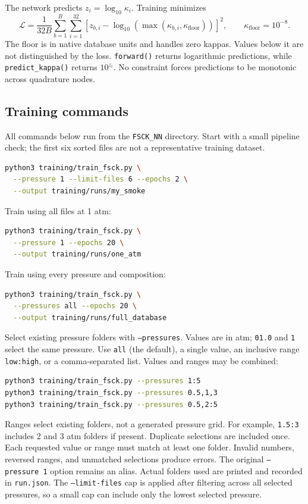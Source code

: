 \documentclass[11pt,letterpaper]{article}
\begin{document}
The network predicts $z_i=\log_{10}\kappa_i$. Training minimizes
\[
\mathcal{L}=\frac{1}{32B}\sum_{b=1}^{B}\sum_{i=1}^{32}
\left[z_{b,i}-\log_{10}\!\left(\max(\kappa_{b,i},\kappa_{\mathrm{floor}})\right)\right]^2,
\qquad \kappa_{\mathrm{floor}}=10^{-8}.
\]
The floor is in native database units and handles zero kappas. Values below it
are not distinguished by the loss. \texttt{forward()} returns logarithmic
predictions, while \texttt{predict\_kappa()} returns $10^{z_i}$. No constraint
forces predictions to be monotonic across quadrature nodes.

\subsection{Training commands}
All commands below run from the \texttt{FSCK\_NN} directory. Start with a small pipeline
check; the first six sorted files are not a representative training dataset.
\begin{lstlisting}[language=bash]
python3 training/train_fsck.py \
  --pressure 1 --limit-files 6 --epochs 2 \
  --output training/runs/my_smoke
\end{lstlisting}
Train using all files at 1 atm:
\begin{lstlisting}[language=bash]
python3 training/train_fsck.py \
  --pressure 1 --epochs 20 \
  --output training/runs/one_atm
\end{lstlisting}
Train using every pressure and composition:
\begin{lstlisting}[language=bash]
python3 training/train_fsck.py \
  --pressures all --epochs 20 \
  --output training/runs/full_database
\end{lstlisting}
Select existing pressure folders with \texttt{--pressures}. Values are in atm;
\texttt{01.0} and \texttt{1} select the same pressure. Use \texttt{all} (the
default), a single value, an inclusive range \texttt{low:high}, or a
comma-separated list. Values and ranges may be combined:
\begin{lstlisting}[language=bash]
python3 training/train_fsck.py --pressures 1:5
python3 training/train_fsck.py --pressures 0.5,1,3
python3 training/train_fsck.py --pressures 0.5,2:5
\end{lstlisting}
Ranges select existing folders, not a generated pressure grid. For example,
\texttt{1.5:3} includes 2 and 3 atm folders if present. Duplicate selections
are included once. Each requested value or range must match at least one
folder. Invalid numbers, reversed ranges, and unmatched selections produce
errors. The original \texttt{--pressure 1} option remains an alias.
Actual folders used are printed and recorded in \texttt{run.json}.
The \texttt{--limit-files} cap is applied after filtering across all selected
pressures, so a small cap can include only the lowest selected pressure.
\end{document}
